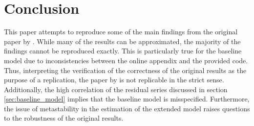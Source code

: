 \section{Conclusion}
\label{sec:conclusion}

This paper attempts to reproduce some of the main findings from the original paper by \citeauthor{JERMANNfinancial}. While many of the results can be approximated, the majority of the findings cannot be reproduced exactly. This is particularly true for the baseline model due to inconsistencies between the online appendix and the provided code. Thus, interpreting the verification of the correctness of the original results as the purpose of a replication, the paper by \citeauthor{JERMANNfinancial} is not replicable in the strict sense. Additionally, the high correlation of the residual series discussed in section \ref{sec:baseline_model} implies that the baseline model is misspecified. Furthermore, the issue of metastability in the estimation of the extended model raises questions to the robustness of the original results.
